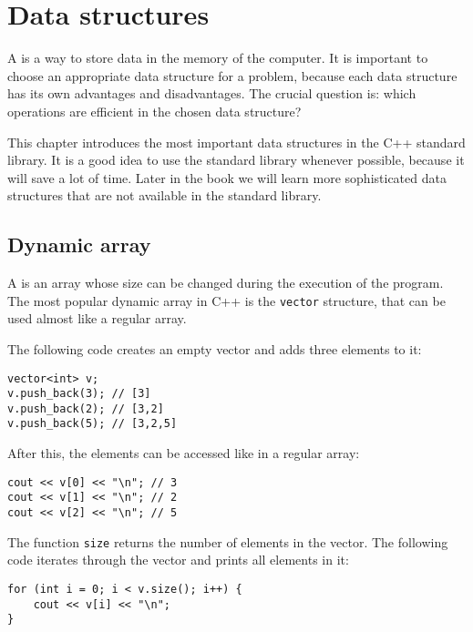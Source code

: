 \chapter{Data structures}


A  is a way to store
data in the memory of the computer.
It is important to choose an appropriate
data structure for a problem,
because each data structure has its own
advantages and disadvantages.
The crucial question is: which operations
are efficient in the chosen data structure?

This chapter introduces the most important
data structures in the C++ standard library.
It is a good idea to use the standard library
whenever possible,
because it will save a lot of time.
Later in the book we will learn more sophisticated
data structures that are not available
in the standard library.

\section{Dynamic array}


A  is an array whose
size can be changed during the execution
of the program.
The most popular dynamic array in C++ is
the \texttt{vector} structure,
that can be used almost like a regular array.

The following code creates an empty vector and
adds three elements to it:

\begin{lstlisting}
vector<int> v;
v.push_back(3); // [3]
v.push_back(2); // [3,2]
v.push_back(5); // [3,2,5]
\end{lstlisting}

After this, the elements can be accessed like in a regular array:

\begin{lstlisting}
cout << v[0] << "\n"; // 3
cout << v[1] << "\n"; // 2
cout << v[2] << "\n"; // 5
\end{lstlisting}

The function \texttt{size} returns the number of elements in the vector.
The following code iterates through
the vector and prints all elements in it:

\begin{lstlisting}
for (int i = 0; i < v.size(); i++) {
    cout << v[i] << "\n";
}
\end{lstlisting}

